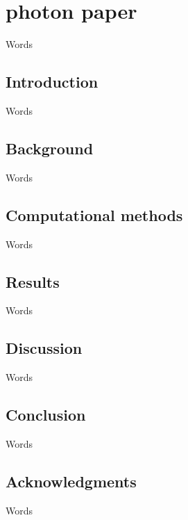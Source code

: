 
\chapter{photon paper}
\author{me, etc}

\label{photons}
Words

 
\section{Introduction}
Words

\section{Background} Words

%
\section{Computational methods}
Words
 
 \section{Results}
 Words

\section{Discussion}
Words

\section{Conclusion}
Words

\section{Acknowledgments}
Words



%
%

